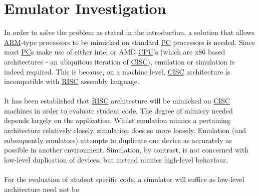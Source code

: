\part{Emulator Investigation}
\label{part1}
In order to solve the problem as stated in the \color{blue}introduction\color{black}, a solution that allows \hyperref[listAbr]{ARM}-type processors to be mimicked on standard \hyperref[listAbr]{PC} processors is needed. Since most \hyperref[listAbr]{PC}s make use of either intel\textsuperscript{{\tiny{\textregistered}}} or AMD\textsuperscript{{\tiny{\textregistered}}} \hyperref[listAbr]{CPU}'s (which are x86 based architectures - an ubiquitous iteration of \hyperref[listAbr]{CISC}), emulation or simulation is indeed required. This is because, on a machine level, \hyperref[listAbr]{CISC} architecture is incompatible with \hyperref[listAbr]{RISC} assembly language.
\\\\
It has been established that \hyperref[listAbr]{RISC} architecture will be mimicked on \hyperref[listAbr]{CISC} machines in order to evaluate student code. The degree of mimicry needed depends largely on the application. Whilst emulation mimics a pertaining architecture relatively closely, simulation does so more loosely. Emulation (and subsequently emulators) attempts to duplicate one device as accurately as possible in another environment. Simulation, by contrast, is not concerned with low-level duplication of devices, but instead mimics high-level behaviour. \cite{Chris}
\\\\
For the evaluation of student specific code, a simulator will suffice as low-level architecture need not be 
